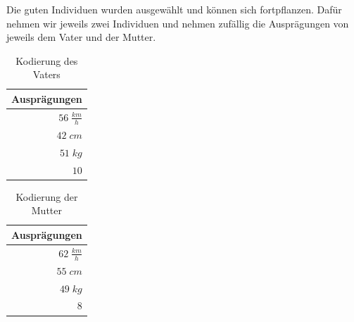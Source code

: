             Die guten Individuen wurden ausgewählt und können sich fortpflanzen. Dafür nehmen wir jeweils zwei Individuen und nehmen zufällig die Ausprägungen von jeweils dem Vater und der Mutter. 
            \\[10mm]
            \begin{multicols}{2}
                \begin{table}[H]
                    \begin{center}
                    \begin{tabular}{ |r| } 
                        \hline
                        \hfill Ausprägungen  \\ \hline
                        \cellcolor{blue!25} $ 56\; \frac{km}{h}$ \\ \hline
                        \cellcolor{blue!25} $ 42\; cm          $ \\ \hline
                        \cellcolor{blue!25} $ 51\; kg          $ \\ \hline
                        \cellcolor{blue!25} $  10              $ \\ \hline
                    \end{tabular}
                    \end{center}
                    \caption{Kodierung des Vaters \label{fig:somelabel}}
                \end{table}

                \begin{table}[H]
                    \begin{center}
                    \begin{tabular}{ |r| } 
                        \hline
                        \hfill Ausprägungen  \\ \hline
                        \cellcolor{yellow!25} $ 62\; \frac{km}{h}$ \\ \hline
                        \cellcolor{yellow!25} $ 55\; cm          $ \\ \hline
                        \cellcolor{yellow!25} $ 49\; kg          $ \\ \hline
                        \cellcolor{yellow!25} $  8               $ \\ \hline
                    \end{tabular}
                    \end{center}
                    \caption{Kodierung der Mutter \label{fig:somelabel}}
                \end{table}

            \end{multicols}

